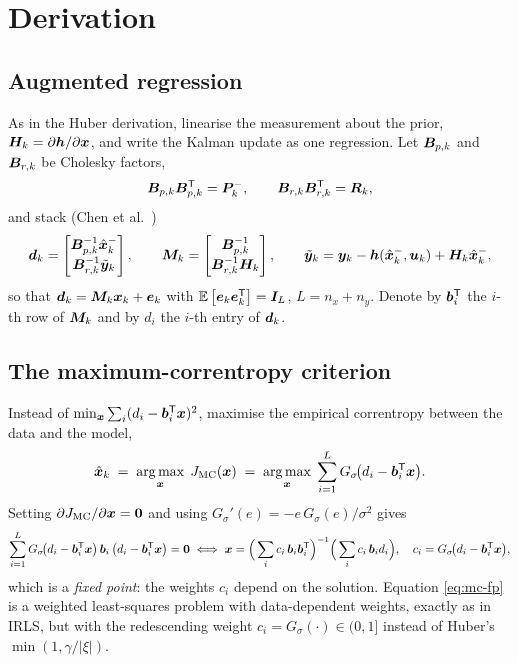 \section{Derivation}

\subsection{Augmented regression}
As in the Huber derivation, linearise the measurement about the prior,
$\bm{H}_k=\partial\bm{h}/\partial\bm{x}$, and write the Kalman update as one regression.  Let
$\bm{B}_{p,k}$ and $\bm{B}_{r,k}$ be Cholesky factors,
\begin{equation}
\bm{B}_{p,k}\bm{B}_{p,k}^{\mathsf{T}}=\bm{P}^{-}_k,\qquad \bm{B}_{r,k}\bm{B}_{r,k}^{\mathsf{T}}=\bm{R}_k,
\label{eq:mc-chol}
\end{equation}
and stack (Chen et al.\ \cite[Eq.~(13)]{chen2017mckf})
\begin{equation}
\bm{d}_k=\begin{bmatrix}\bm{B}_{p,k}^{-1}\hat{\bm{x}}^{-}_k\\[2pt] \bm{B}_{r,k}^{-1}\tilde{\bm{y}}_k\end{bmatrix},
\qquad
\bm{M}_k=\begin{bmatrix}\bm{B}_{p,k}^{-1}\\[2pt] \bm{B}_{r,k}^{-1}\bm{H}_k\end{bmatrix},
\qquad
\tilde{\bm{y}}_k=\bm{y}_k-\bm{h}(\hat{\bm{x}}^{-}_k,\bm{u}_k)+\bm{H}_k\hat{\bm{x}}^{-}_k,
\label{eq:mc-stack}
\end{equation}
so that $\bm{d}_k=\bm{M}_k\bm{x}_k+\bm{e}_k$ with $\mathbb{E}\left[\bm{e}_k\bm{e}_k^{\mathsf{T}}\right]=\bm{I}_{L}$, $L=n_x+n_y$.  Denote by
$\bm{b}_i^{\mathsf{T}}$ the $i$-th row of $\bm{M}_k$ and by $d_i$ the $i$-th entry of $\bm{d}_k$.

\subsection{The maximum-correntropy criterion}
Instead of $\min_{\bm{x}}\sum_i (d_i-\bm{b}_i^{\mathsf{T}}\bm{x})^2$, maximise the empirical correntropy between the
data and the model,
\begin{equation}
\hat{\bm{x}}_k \;=\; \operatorname*{arg\,max}_{\bm{x}}\; J_{\mathrm{MC}}(\bm{x})
 \;=\; \operatorname*{arg\,max}_{\bm{x}}\;\sum_{i=1}^{L} G_\sigma\!\big(d_i-\bm{b}_i^{\mathsf{T}}\bm{x}\big).
\label{eq:mc-J}
\end{equation}
Setting $\partial J_{\mathrm{MC}}/\partial\bm{x}=\bm 0$ and using
$G_\sigma'(e)=-e\,G_\sigma(e)/\sigma^2$ gives
\begin{equation}
\sum_{i=1}^{L} G_\sigma\!\big(d_i-\bm{b}_i^{\mathsf{T}}\bm{x}\big)\,\bm{b}_i\,\big(d_i-\bm{b}_i^{\mathsf{T}}\bm{x}\big)=\bm 0
\;\Longleftrightarrow\;
\bm{x}=\Big(\sum_i c_i\,\bm{b}_i\bm{b}_i^{\mathsf{T}}\Big)^{-1}\Big(\sum_i c_i\,\bm{b}_i d_i\Big),
\quad c_i=G_\sigma\!\big(d_i-\bm{b}_i^{\mathsf{T}}\bm{x}\big),
\label{eq:mc-fp}
\end{equation}
which is a \emph{fixed point}: the weights $c_i$ depend on the solution.  Equation
\eqref{eq:mc-fp} is a weighted least-squares problem with data-dependent weights, exactly as in
IRLS, but with the redescending weight $c_i=G_\sigma(\cdot)\in(0,1]$ instead of Huber's
$\min(1,\gamma/|\xi|)$.

